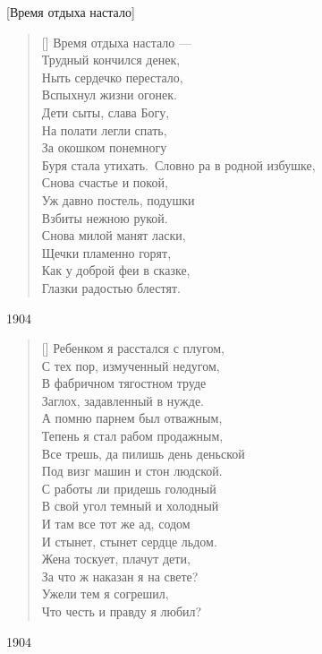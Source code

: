 \poemtitle{***}[Время отдыха настало]
\settowidth{\versewidth}{Время отдыха настало}
\begin{verse}[\versewidth]
Время отдыха настало ---\\
Трудный кончился денек,\\
Ныть сердечко перестало,\\
Вспыхнул жизни огонек.\\
Дети сыты, слава Богу,\\
На полати легли спать,\\
За окошком понемногу\\
Буря стала утихать.\
Словно ра в родной избушке,\\
Снова счастье и покой,\\
Уж давно постель, подушки\\
Взбиты нежною рукой.\\
Снова милой манят ласки,\\
Щечки пламенно горят,\\
Как у доброй феи в сказке,\\
Глазки радостью блестят.
\end{verse}
1904

\settowidth{\versewidth}{С тех пор измученный недугом}
\begin{verse}[\versewidth]
Ребенком я расстался с плугом,\\
С тех пор, измученный недугом,\\
В фабричном тягостном труде\\
Заглох, задавленный в нужде.\\
А помню парнем был отважным,\\
Тепень я стал рабом продажным,\\
Все трешь, да пилишь день деньской\\
Под визг машин и стон людской.\\
С работы ли придешь голодный\\
В свой угол темный и холодный\\
И там все тот же ад, содом\\
И стынет, стынет сердце льдом.\\
Жена тоскует, плачут дети,\\
За что ж наказан я на свете?\\
Ужели тем я согрешил,\\
Что честь и правду я любил?
\end{verse}
1904

